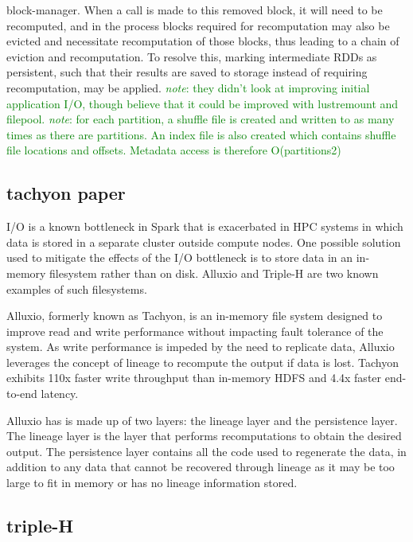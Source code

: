 \documentclass{report}
\newcommand{\note}[1]{\textcolor{green}{\textit{note}: #1}}
\begin{document}
block-manager. When a call is made to this removed block, it will need to be
recomputed, and in the process blocks required for recomputation may also be
evicted and necessitate recomputation of those blocks, thus leading to a chain
of eviction and recomputation. To resolve this, marking intermediate RDDs as
persistent, such that their results are saved to storage instead of requiring
recomputation, may be applied.  \note{they didn't look at improving initial
application I/O, though believe that it could be improved with lustremount and
filepool. } \note{for each partition, a shuffle file is created and written to
as many times as there are partitions. An index file is also created which
contains shuffle file locations and offsets. Metadata access is therefore
O(partitions2)}
	
    \subsection{tachyon paper} I/O is a known bottleneck in Spark that is
exacerbated in HPC systems in which data is stored in a separate cluster outside
compute nodes. One possible solution used to mitigate the effects of the I/O
bottleneck is to store data in an in-memory filesystem rather than on disk.
Alluxio and Triple-H are two known examples of such filesystems.
	
    Alluxio, formerly known as Tachyon, is an in-memory file system designed to
improve read and write performance without impacting fault tolerance of the
system. As write performance is impeded by the need to replicate data, Alluxio
leverages the concept of lineage to recompute the output if data is lost.
Tachyon exhibits 110x faster write throughput than in-memory HDFS and 4.4x
faster end-to-end latency. 

    Alluxio has is made up of two layers: the lineage layer and the persistence
layer. The lineage layer is the layer that performs recomputations to obtain the
desired output. The persistence layer contains all the code used to regenerate
the data, in addition to any data that cannot be recovered through lineage
as it may be too large to fit in memory or has no lineage information stored.
	
    \subsection{triple-H}
	
	
	
	
	
\end{document}
